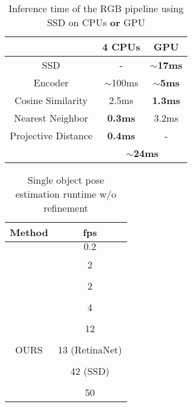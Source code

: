 \begin{table}[t]
		\scriptsize
		\centering
		\captionsetup{width=0.8\columnwidth}
		\caption{Inference time of the RGB pipeline using SSD on CPUs \textbf{or} GPU}
\begin{tabular}{ccc}
			\toprule
			& 4 CPUs & GPU\\
			\midrule
			SSD & - & \textbf{$\sim$17ms}\\
			Encoder & $\sim$100ms & \textbf{$\sim$5ms}\\
			Cosine Similarity & 2.5ms & \textbf{1.3ms}\\
			Nearest Neighbor &	\textbf{0.3ms} &	3.2ms\\
			Projective Distance &	\textbf{0.4ms} &	-\\
			\midrule
			&\multicolumn{2}{c}{\textbf{$\sim$24ms}}\\
		\end{tabular}
\label{tab:infer}
\end{table}
\begin{table}[t]
		\centering
		\scriptsize
		\captionsetup{width=0.8\columnwidth}
		\caption{Single object pose estimation runtime w/o refinement}
\begin{tabular}{cc}
			\toprule
			Method & fps \\
			\midrule
			\cite{vidal20186d} & $0.2$\\
				\\[-0.6em]
			\cite{brachmann2016uncertainty} & 2 \\
			\\[-0.6em]
			\cite{kehl2016deep} & 2 \\
			\\[-0.6em]
			\cite{rad2017bb8} & 4 \\
			\\[-0.6em]
			\cite{kehl2017ssd} & 12 \\
			\\[-0.6em]
			OURS & 13 (RetinaNet) \\
			\\[-0.6em]
				&  42 (SSD) \\
			\\[-0.6em]
			\cite{tekin2017real} & 50 \\
		\end{tabular}
\label{tab:runtime_compare}
		

\end{table}

